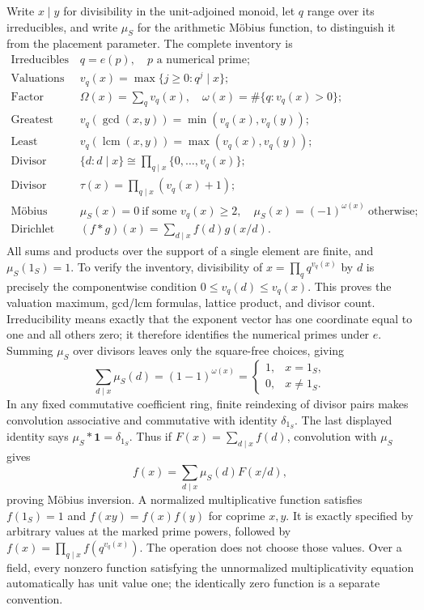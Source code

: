 Write $x\mid y$ for divisibility in the unit-adjoined monoid, let
$q$ range over its irreducibles, and write $\mu_S$ for the arithmetic
M\"obius function, to distinguish it from the placement parameter.
The complete inventory is
\[
\begin{array}{ll}
 \text{Irreducibles}&q=e(p),\quad p\text{ a numerical prime};\\[2pt]
 \text{Valuations}&v_q(x)=\max\{j\geq0:q^j\mid x\};\\[2pt]
 \text{Factor counts}&\Omega(x)=\sum_qv_q(x),\quad
             \omega(x)=\#\{q:v_q(x)>0\};\\[2pt]
 \text{Greatest common divisor}&
       v_q(\gcd(x,y))=\min(v_q(x),v_q(y));\\[2pt]
 \text{Least common multiple}&
       v_q(\operatorname{lcm}(x,y))=\max(v_q(x),v_q(y));\\[2pt]
 \text{Divisor lattice}&
       \{d:d\mid x\}\cong\prod_{q\mid x}\{0,\ldots,v_q(x)\};\\[2pt]
 \text{Divisor count}&\tau(x)=\prod_{q\mid x}(v_q(x)+1);\\[2pt]
 \text{M\"obius function}&
       \mu_S(x)=0\ \text{if some }v_q(x)\geq2,
       \quad\mu_S(x)=(-1)^{\omega(x)}\ \text{otherwise};\\[2pt]
 \text{Dirichlet convolution}&
       (f*g)(x)=\sum_{d\mid x}f(d)g(x/d).
\end{array}
\]
All sums and products over the support of a single element are finite,
and $\mu_S(1_S)=1$.  To verify the inventory, divisibility of
$x=\prod_q q^{v_q(x)}$ by $d$ is precisely the componentwise condition
$0\leq v_q(d)\leq v_q(x)$.  This proves the valuation maximum,
gcd/lcm formulas, lattice product, and divisor count.  Irreducibility
means exactly that the exponent vector has one coordinate equal to
one and all others zero; it therefore identifies the numerical
primes under $e$.  Summing $\mu_S$ over divisors leaves only the
square-free choices, giving
\[
 \sum_{d\mid x}\mu_S(d)=(1-1)^{\omega(x)}
 =\begin{cases}1,&x=1_S,\\0,&x\ne1_S.\end{cases}
\]
In any fixed commutative coefficient ring, finite reindexing of
divisor pairs makes convolution associative and commutative with
identity $\delta_{1_S}$.  The last displayed identity says
$\mu_S*\mathbf1=\delta_{1_S}$.  Thus if
$F(x)=\sum_{d\mid x}f(d)$, convolution with $\mu_S$ gives
\[
 f(x)=\sum_{d\mid x}\mu_S(d)F(x/d),
\]
proving M\"obius inversion.  A normalized multiplicative function
satisfies $f(1_S)=1$ and $f(xy)=f(x)f(y)$ for coprime $x,y$.
It is exactly specified by arbitrary values at the marked prime
powers, followed by
$f(x)=\prod_{q\mid x}f(q^{v_q(x)})$.  The operation does not choose
those values.  Over a field, every nonzero function satisfying the
unnormalized multiplicativity equation automatically has unit
value one; the identically zero function is a separate convention.

